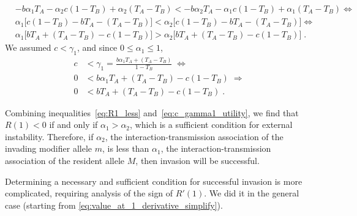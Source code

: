 \documentclass[12pt]{extarticle}
\begin{document}
\begin{appendices}
\begin{equation}
\begin{aligned}
& - b \alpha_1 T_A -\alpha_2 c(1-T_B) +\alpha_2(T_A - T_B) < 
  - b\alpha_2 T_A -\alpha_1 c (1-T_B) +\alpha_1 (T_A-T_B)  \Leftrightarrow \\
& \alpha_1 \big[c (1-T_B) - b T_A-(T_A-T_B)\big]  < 
  \alpha_2 \big[c(1-T_B)-b T_A -(T_A - T_B)\big] \Leftrightarrow \\
& \alpha_1 \big[b T_A + (T_A-T_B) - c (1-T_B)\big]  > 
  \alpha_2 \big[b T_A + (T_A-T_B) - c (1-T_B)\big] \;.
\end{aligned}
\end{equation}
We assumed $c<\gamma_1$, and since $0 \le \alpha_1 \le 1$,
\begin{equation} \label{eq:c_gamma1_utility}
\begin{aligned}
c &< \gamma_1 = \frac{b \alpha_1 T_A + (T_A-T_B)}{1-T_B} \; \Leftrightarrow \\
0 &< b \alpha_1 T_A + (T_A-T_B) - c(1-T_B) \; \Rightarrow \\
0 &< b T_A + (T_A-T_B) - c(1-T_B) \;.
\end{aligned}
\end{equation}

Combining inequalities~\ref{eq:R1_less} and~\ref{eq:c_gamma1_utility}, we find that $R(1)<0$ if and only if $\alpha_1 > \alpha_2$, which is a sufficient condition for external instability. 
Therefore, if $\alpha_2$, the interaction-transmission association of the invading modifier allele $m$, is less than $\alpha_1$, the interaction-transmission association of the resident allele $M$, then invasion will be successful.

Determining a necessary and sufficient condition for successful invasion is more complicated, requiring analysis of the sign of $R'(1)$.
We did it in the general case (starting from \autoref{eq:value_at_1_derivative_simplify}).
  
\end{appendices}
\end{document}

